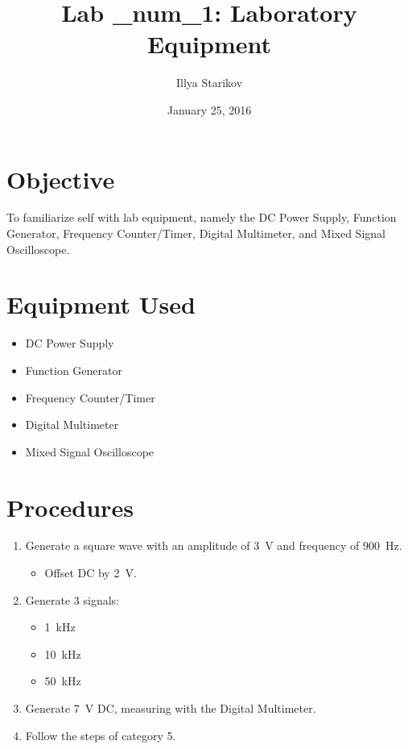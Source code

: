 \documentclass[12pt]{article}
\begin{document}
\title{Lab \_num_1: Laboratory Equipment}
\date{January 25, 2016}
\author{Illya Starikov}
\maketitle


\section{Objective}
To familiarize self with lab equipment, namely the DC Power Supply, Function Generator, Frequency Counter/Timer, Digital Multimeter, and Mixed Signal Oscilloscope.

\section{Equipment Used}
\begin{itemize}
\item DC Power Supply
\item Function Generator
\item Frequency Counter/Timer
\item Digital Multimeter
\item Mixed Signal Oscilloscope
\end{itemize}

\section{Procedures}
\begin{enumerate}
\item Generate a square wave with an amplitude of \SI{3}{\volt} and frequency of \SI{900}{\hertz}.
    \begin{itemize}
    \item Offset DC by \SI{2}{\volt}.
    \end{itemize}
\item Generate 3 signals:
    \begin{itemize}
    \item \SI{1}{\kilo\hertz}
    \item \SI{10}{\kilo\hertz}
    \item \SI{50}{\kilo\hertz}
    \end{itemize}
\item Generate \SI{7}{\volt} DC, measuring with the Digital Multimeter.
\item Follow the steps of category 5.
\end{enumerate}
\end{document}
